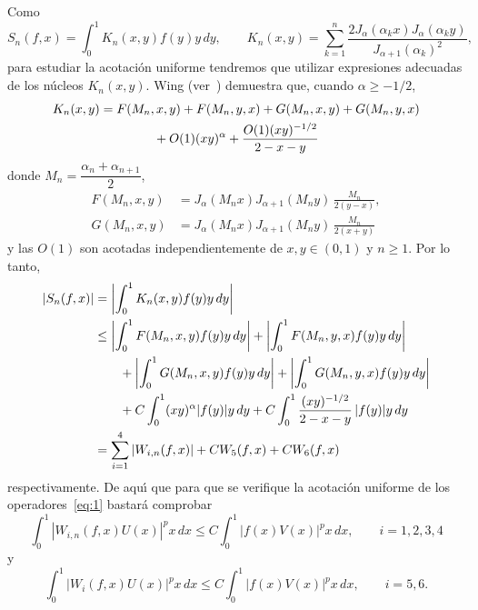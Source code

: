 \documentclass[a4paper]{article}
\begin{document}
Como
\begin{equation*}
  S_{n}(f,x) = \int_{0}^{1} K_{n}(x,y)f(y)y\,dy,
  \qquad
  K_{n}(x,y) = \sum_{k=1}^n
  \frac{2J_{\alpha}(\alpha_{k}x)J_{\alpha}(\alpha_{k}y)}{J_{\alpha+1}(\alpha_{k})^2},
\end{equation*}
para estudiar la acotaci\'on uniforme tendremos que utilizar 
expresiones adecuadas de los n\'ucleos $K_{n}(x,y)$. Wing (ver~\cite{Wi}) 
demuestra que, cuando $\alpha \geq -1/2$,
\begin{multline*}
  K_{n}(x,y) = F(M_{n},x,y) + F(M_{n},y,x) + G(M_{n},x,y) + G(M_{n},y,x) \\
  \null+ O(1)(xy)^{\alpha} + \frac{O(1)(xy)^{-1/2}}{2-x-y}
\end{multline*}
donde $M_{n} = \dfrac{\alpha_{n} + \alpha_{n+1}}{2}$,
\begin{align*}
  F(M_{n},x,y) &= J_{\alpha}(M_{n}x)J_{\alpha+1}(M_{n}y) \,\frac{M_{n}}{2(y-x)}, \\
  G(M_{n},x,y) &= J_{\alpha}(M_{n}x)J_{\alpha+1}(M_{n}y) \,\frac{M_{n}}{2(x+y)}
\end{align*}
y las $O(1)$ son acotadas independientemente de $x, y \in (0,1)$
y $n \geq 1$. Por lo tanto,
\begin{align*}
  |S_{n}(f,x)| &= \left| \int_{0}^{1} K_{n}(x,y)f(y)y\,dy \right| \\
  &\leq \left| \int_{0}^{1} F(M_{n},x,y)f(y)y\,dy \right| + 
  \left|\int_{0}^{1} F(M_{n},y,x)f(y)y\,dy \right| \\ 
  &\qquad\null+ \left| \int_{0}^{1} G(M_{n},x,y)f(y)y\,dy \right|
  + \left|\int_{0}^{1} G(M_{n},y,x)f(y)y\,dy\right| \\
  &\qquad\null+ C\int_{0}^{1} (xy)^{\alpha}|f(y)|y\,dy
  + C\int_{0}^{1} \frac{(xy)^{-1/2}}{2-x-y}\,|f(y)|y\,dy \\
  &= \sum_{i=1}^4 |W_{i,n}(f,x)| + C W_{5}(f,x) + C W_{6}(f,x)
\end{align*}
respectivamente. De aqu\'{\i} que para que se verifique la acotaci\'on 
uniforme de los operadores~\eqref{eq:1} bastar\'a comprobar
\begin{equation}
\label{eq:3}
  \int_{0}^{1} |W_{i,n}(f,x)U(x)|^p x\,dx
  \leq C\int_{0}^{1} |f(x)V(x)|^p x\,dx, 
  \qquad i = 1, 2, 3, 4
\end{equation}
y
\begin{equation}
\label{eq:4}
  \int_{0}^{1} |W_{i}(f,x)U(x)|^p x\,dx
  \leq C\int_{0}^{1} |f(x)V(x)|^p x\,dx, 
  \qquad i = 5, 6.
\end{equation}
\end{document}
